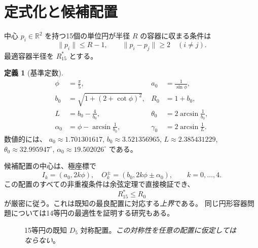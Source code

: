 \documentclass[11pt,a4paper]{article}
\theoremstyle{JPthm}
\theoremstyle{definition}
\newtheorem{definition}[theorem]{定義}
\newcommand{\Rstar}{R_{15}^{*}}
\newcommand{\Rc}{R_{0}}
\newcommand{\thzero}{\theta_{0}}
\newcommand{\azero}{a_{0}}
\newcommand{\bzero}{b_{0}}
\begin{document}
\section{定式化と候補配置}
中心 $p_i\in\mathbb R^2$ を持つ15個の単位円が半径 $R$ の容器に収まる条件は
\begin{equation}\label{eq:feasibility}
 \|p_i\|\le R-1,\qquad \|p_i-p_j\|\ge2\quad(i\ne j).
\end{equation}
最適容器半径を $\Rstar$ とする。
\begin{definition}[基準定数]\label{def:constants}
\begin{align}
 \phi&=\frac\pi5, &\azero&=\frac1{\sin\phi},\\
 \bzero&=\sqrt{1+(2+\cot\phi)^2}, &\Rc&=1+\bzero,\\
 L&=\bzero-\frac4{\bzero},&\thzero&=2\arcsin\frac1{\bzero},\\
 \alpha_0&=\phi-\arcsin\frac1{\bzero}, & \gamma_0&=2\arcsin\frac1L.
\end{align}
数値的には、
$\azero\approx1.701301617$, $\bzero\approx3.521356965$,
$L\approx2.385431229$, $\thzero\approx32.995947^\circ$,
$\alpha_0\approx19.502026^\circ$ である。
\end{definition}
候補配置の中心は、極座標で
\begin{equation}\label{eq:candidate}
 I_k=(\azero,2k\phi),\quad
 O_k^{\pm}=(\bzero,2k\phi\pm\alpha_0),\qquad k=0,\ldots,4.
\end{equation}
この配置のすべての非重複条件は余弦定理で直接検証でき、
\begin{equation}\Rstar\le\Rc\end{equation}
が厳密に従う。これは既知の最良配置に対応する\emph{上界}である\cite{packomania}。
同じ円形容器問題については14等円の最適性を証明する研究もある\cite{ekanayake}。
\begin{figure}[H]\centering
{}
\caption{15等円の既知 $D_5$ 対称配置。\emph{この対称性を任意の配置に仮定してはならない}。}
\end{figure}
\end{document}
